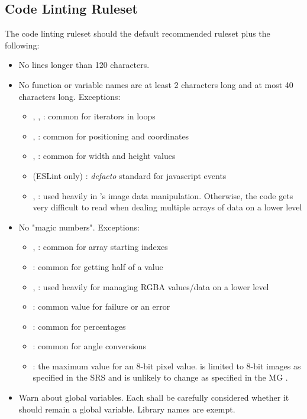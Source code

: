 \documentclass[12pt, titlepage]{article}
\begin{document}
\subsection{Code Linting Ruleset} \label{codelint_ruleset}
The code linting ruleset should the default recommended ruleset plus the following:
\begin{itemize}
  \item No lines longer than 120 characters.
  \item No function or variable names are at least 2 characters long and at most 40 characters long.
    Exceptions:
    \begin{itemize}
      \item {}, , : common for iterators in loops
      \item {}, : common for positioning and coordinates
      \item {}, : common for width and height values
      \item (ESLint only) : \textit{defacto} standard for javascript events
      \item {}, : used heavily in \progname{}'s image data manipulation.
        Otherwise, the code gets very difficult to read when dealing multiple arrays of data 
        on a lower level
    \end{itemize}
  \item No "magic numbers". Exceptions:
    \begin{itemize}
      \item {}, : common for array starting indexes
      \item {}: common for getting half of a value
      \item {}, : used heavily for managing RGBA values/data on a lower level
      \item {}: common value for failure or an error
      \item {}: common for percentages
      \item {}: common for angle conversions
      \item {}: the maximum value for an 8-bit pixel value.
        \progname{} is limited to 8-bit images as specified in the SRS \cite{SRS}
        and is unlikely to change as specified in the MG \cite{MG}.
    \end{itemize}
  \item Warn about global variables. Each shall be carefully considered whether it should remain
    a global variable. Library names are exempt.
\end{itemize}
\end{document}
